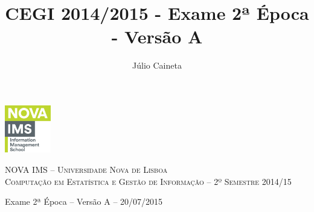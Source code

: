 \documentclass[addpoints]{exam}
\author{Júlio Caineta}
\title{CEGI 2014/2015 - Exame 2ª Época - Versão A}
\begin{document}
	
\noindent\begin{minipage}{0.2\textwidth}%
	\includegraphics[width=2cm]{logo.png}
\end{minipage}
\hfill
\begin{minipage}{0.8\textwidth}
	\begin{center}
		\textsc {\small NOVA IMS -- Universidade Nova de Lisboa} \\
		\textsc {Computação em Estatística e Gestão de Informação -- 2º Semestre 2014/15}
	\end{center}
\end{minipage}

\begin{center}
	{\large Exame 2ª Época -- Versão A -- 20/07/2015}
\end{center}
 
\vspace{5mm}
\vspace{5mm}
\end{document}
